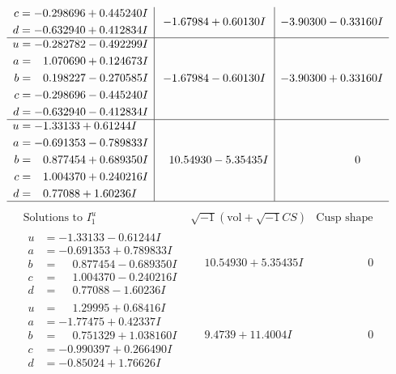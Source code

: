 \documentclass[1p]{elsarticle_modified}
\theoremstyle{definition}
\newcommand{\I}{\sqrt{-1}}
\begin{document}
$$\begin{array}{c|c|c}
\begin{aligned}
c &= -0.298696 + 0.445240 I \\
d &= -0.632940 + 0.412834 I\end{aligned}
 & -1.67984 + 0.60130 I & -3.90300 - 0.33160 I \\ \hline\begin{aligned}
u &= -0.282782 - 0.492299 I \\
a &= \phantom{-}1.070690 + 0.124673 I \\
b &= \phantom{-}0.198227 - 0.270585 I \\
c &= -0.298696 - 0.445240 I \\
d &= -0.632940 - 0.412834 I\end{aligned}
 & -1.67984 - 0.60130 I & -3.90300 + 0.33160 I \\ \hline\begin{aligned}
u &= -1.33133 + 0.61244 I \\
a &= -0.691353 - 0.789833 I \\
b &= \phantom{-}0.877454 + 0.689350 I \\
c &= \phantom{-}1.004370 + 0.240216 I \\
d &= \phantom{-}0.77088 + 1.60236 I\end{aligned}
 & \phantom{-}10.54930 - 5.35435 I & \phantom{-0.000000 } 0\\
 \hline 
 \end{array}$$\newpage$$\begin{array}{c|c|c}  
\text{Solutions to }I^u_{1}& \I (\text{vol} + \sqrt{-1}CS) & \text{Cusp shape}\\
 \hline 
\begin{aligned}
u &= -1.33133 - 0.61244 I \\
a &= -0.691353 + 0.789833 I \\
b &= \phantom{-}0.877454 - 0.689350 I \\
c &= \phantom{-}1.004370 - 0.240216 I \\
d &= \phantom{-}0.77088 - 1.60236 I\end{aligned}
 & \phantom{-}10.54930 + 5.35435 I & \phantom{-0.000000 } 0 \\ \hline\begin{aligned}
u &= \phantom{-}1.29995 + 0.68416 I \\
a &= -1.77475 + 0.42337 I \\
b &= \phantom{-}0.751329 + 1.038160 I \\
c &= -0.990397 + 0.266490 I \\
d &= -0.85024 + 1.76626 I\end{aligned}
 & \phantom{-}9.4739 + 11.4004 I & \phantom{-0.000000 } 0 \\ \hline\begin{aligned}

\end{aligned}
\end{array}$$
\end{document}
